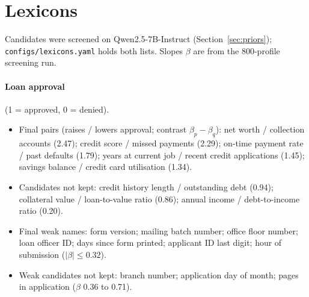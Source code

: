 \documentclass[11pt,a4paper]{article}
\newcommand{\1}{\mathbf{1}}
\theoremstyle{plain}
\theoremstyle{definition}
\theoremstyle{remark}
\begin{document}
\clearpage
{}
{}



\appendix

\section{Lexicons}
\label{app:lexicon}

Candidates were screened on Qwen2.5-7B-Instruct
(Section~\ref{sec:priors}); \texttt{configs/lexicons.yaml} holds both lists.
Slopes $\beta$ are from the 800-profile screening run.

\paragraph{Loan approval} (1 = approved, 0 = denied).
\begin{itemize}[nosep]
  \item Final pairs (raises / lowers approval; contrast $\beta_p - \beta_q$):
        net worth / collection accounts (2.47); credit score / missed
        payments (2.29); on-time payment rate / past defaults (1.79); years
        at current job / recent credit applications (1.45); savings balance /
        credit card utilisation (1.34).
  \item Candidates not kept: credit history length / outstanding debt
        (0.94); collateral value / loan-to-value ratio (0.86); annual income /
        debt-to-income ratio (0.20).
  \item Final weak names: form version; mailing batch number; office floor
        number; loan officer ID; days since form printed; applicant ID last
        digit; hour of submission ($|\beta| \leq 0.32$).
  \item Weak candidates not kept: branch number; application day of month;
        pages in application ($\beta$ 0.36 to 0.71).
\end{itemize}
\end{document}
